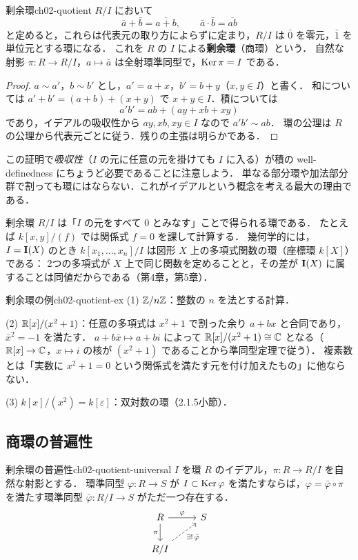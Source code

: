 \begin{myprop}{剰余環}{ch02-quotient}
$R/I$ において
\[
  \bar a+\bar b=\overline{a+b},\qquad \bar a\cdot\bar b=\overline{ab}
\]
と定めると，これらは代表元の取り方によらずに定まり，$R/I$ は $\bar0$ を零元，$\bar1$ を単位元とする環になる．
これを $R$ の $I$ による\textbf{剰余環}（商環）という．
自然な射影 $\pi:R\to R/I$，$a\mapsto\bar a$ は全射環準同型で，$\operatorname{Ker}\pi=I$ である．
\end{myprop}

\begin{proof}
$a\sim a'$，$b\sim b'$ とし，$a'=a+x$，$b'=b+y$（$x,y\in I$）と書く．
和については $a'+b'=(a+b)+(x+y)$ で $x+y\in I$．積については
\[
  a'b'=ab+(ay+xb+xy)
\]
であり，イデアルの吸収性から $ay,xb,xy\in I$ なので $a'b'\sim ab$．
環の公理は $R$ の公理から代表元ごとに従う．残りの主張は明らかである．
\end{proof}

この証明で\emph{吸収性}（$I$ の元に任意の元を掛けても $I$ に入る）が積の well-definedness にちょうど必要であることに注意しよう．
単なる部分環や加法部分群で割っても環にはならない．これがイデアルという概念を考える最大の理由である．

剰余環 $R/I$ は「$I$ の元をすべて $0$ とみなす」ことで得られる環である．
たとえば $k[x,y]/(f)$ では関係式 $f=0$ を課して計算する．
幾何学的には，$I=\mathbf{I}(X)$ のとき $k[x_1,\dots,x_n]/I$ は図形 $X$ 上の多項式関数の環（座標環 $k[X]$）である：
2つの多項式が $X$ 上で同じ関数を定めることと，その差が $\mathbf{I}(X)$ に属することは同値だからである（第4章，第5章）．

\begin{myex}{剰余環の例}{ch02-quotient-ex}
(1) $\mathbb{Z}/n\mathbb{Z}$：整数の $n$ を法とする計算．

(2) $\mathbb{R}[x]/(x^2+1)$：任意の多項式は $x^2+1$ で割った余り $a+bx$ と合同であり，$\bar x^2=-1$ を満たす．
$a+b\bar x\mapsto a+bi$ によって $\mathbb{R}[x]/(x^2+1)\cong\mathbb{C}$ となる（$\mathbb{R}[x]\to\mathbb{C}$，$x\mapsto i$ の核が $(x^2+1)$ であることから準同型定理で従う）．
複素数とは「実数に $x^2+1=0$ という関係式を満たす元を付け加えたもの」に他ならない．

(3) $k[x]/(x^2)=k[\varepsilon]$：双対数の環（2.1.5小節）．
\end{myex}

\subsection{商環の普遍性}

\begin{mythm}{剰余環の普遍性}{ch02-quotient-universal}
$I$ を環 $R$ のイデアル，$\pi:R\to R/I$ を自然な射影とする．
環準同型 $\varphi:R\to S$ が $I\subset\operatorname{Ker}\varphi$ を満たすならば，$\varphi=\bar\varphi\circ\pi$ を満たす環準同型
$\bar\varphi:R/I\to S$ がただ一つ存在する．
\[
\begin{tikzcd}
  R \arrow[r,"\varphi"] \arrow[d,"\pi"'] & S\\
  R/I \arrow[ru,dashed,"\exists!\,\bar\varphi"'] &
\end{tikzcd}
\]
\end{mythm}

